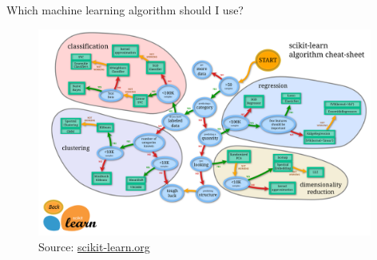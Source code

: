 \documentclass[pdf]{beamer}
\begin{document}
\begin{frame}{Which machine learning algorithm should I use?}
\begin{figure}	
	\begin{center}
		\includegraphics[width=0.98\textwidth]{scikitFlowChart.png}
		\caption{Source: \href{http://scikit-learn.org/stable/tutorial/machine_learning_map/index.html}{scikit-learn.org}}
	\end{center}
\end{figure}
\end{frame}
\end{document}
